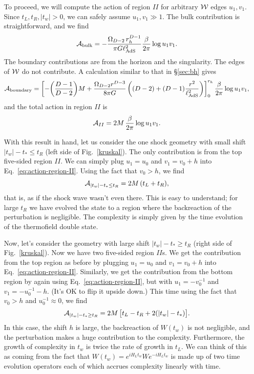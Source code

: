 \documentclass[12pt]{article}
\numberwithin{equation}{section}
\newcommand{\be}{\begin{equation}}
\newcommand{\ee}{\end{equation}}
\def\CA{{\cal A}}
\def\CW{{\cal W}}
\newcommand{\lads}{\ell_{\text{AdS}}}
\renewcommand{\eqref}[1]{Eq.~\ref{#1}}
\begin{document}
 To proceed, we will compute the action of region $II$ for arbitrary $\CW$ edges $u_1, v_1$. Since $t_L, t_R, |t_w| > 0$, we can safely assume $u_1, v_1 \gg 1$. The bulk contribution is straightforward, and we find
 \be
\CA_\textrm{bulk} = -\frac{\Omega_{D-2} \, r_h^{D-1}}{ \pi G \lads^2} \frac{\beta}{2\pi} \log u_1 v_1.
 \ee
 The boundary contributions are from the horizon and the singularity. The edges of $\CW$ do not contribute. A calculation similar to that in \S\ref{sec:bh} gives
  \be
\CA_\textrm{boundary} =  \left[  - \bigg( \frac{D-1 }{D-2}\bigg) M  + \frac{\Omega_{D-2} r^{D-3} }{8 \pi G}  \left( (D - 2 ) + (D-1) \frac{r^2}{\lads^2} \right) \right]^{r_h}_0  \frac{\beta}{2\pi} \log u_1 v_1,
 \ee
 and the total action in region $II$ is
 \be
\CA_{II} = 2M\, \frac{\beta}{2\pi} \log u_1 v_1. \label{eq:action-region-II}
 \ee

With this result in hand, let us consider the one shock geometry with small shift $|t_w| - t_* \le t_R$ (left side of Fig.~\ref{kruskal}). The only contribution is from the top five-sided region $II$. We can simply plug $u_1 = u_0$ and $v_1 = v_0 + h$ into \eqref{eq:action-region-II}. Using the fact that $v_0 > h$, we find
\be
\CA_{|t_w| - t_* \le t_R} = 2M\, (t_L + t_R),\label{eq:one-shock-complexity-weak-shock}
\ee
that is, as if the shock wave wasn't even there. This is easy to understand; for large $t_R$ we have evolved the state to a region where the backreaction of the perturbation is negligible. The complexity is simply given by the time evolution of the thermofield double state.


Now, let's consider the geometry with large shift $|t_w| - t_* \ge t_R$ (right side of Fig.~\ref{kruskal}). Now we have two five-sided region $II$s. We get the contribution from the top region as before by  plugging $u_1 = u_0$ and $v_1 = v_0 + h$ into \eqref{eq:action-region-II}. Similarly, we get the contribution from the bottom region by again using \eqref{eq:action-region-II}, but with  $u_1 = -v_0^{-1}$  and $v_1 = -u_0^{-1} - h$. (It's OK to flip it upside down.) This time using the fact that $v_0 > h$ and $u_0^{-1} \approx 0$, we find
\be
\CA_{|t_w| - t_* \ge t_R} = 2M\, \big[t_L - t_R + 2(|t_w| - t_*)\big].\label{eq:one-shock-complexity-strong-shock}
\ee
In this case, the shift $h$ is large, the backreaction of $W(t_w)$ is not negligible, and the perturbation makes a huge contribution to the complexity. Furthermore, the growth of complexity in $t_w$ is twice the rate of growth in $t_L$. We can think of this as coming from the fact that $W(t_w) = e^{i H_L t_w} W e^{-i H_L t_w}$ is made up of two time evolution operators each of which accrues complexity linearly with time.
\end{document}
